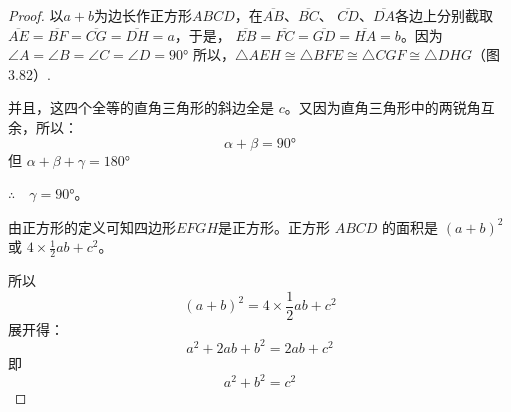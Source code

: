 \begin{proof}
以$a+b$为边长作正方形$ABCD$，在$\overline{AB}$、$\overline{BC}$、
$\overline{CD}$、$\overline{DA}$各边上分别截取$\overline{AE}=\overline{BF}=\overline{CG}=\overline{DH}=a$，于是，
$\overline{EB}=\overline{FC}=\overline{GD}=\overline{HA}=b$。因为$\angle A=\angle B=\angle C=\angle D=\ang{90}$
所以，$\triangle AEH\cong \triangle BFE\cong \triangle CGF\cong \triangle DHG$（图3.82）.

并且，这四个全等的直角三角形的斜边全是 $c$。又因为直角三角形中的两锐角互余，所以：
\[\alpha+\beta=\ang{90}\]
但 $\alpha+\beta+\gamma=\ang{180}$

$\therefore\quad \gamma=\ang{90}$。

由正方形的定义可知四边形$EFGH$是正方形。正方形 $ABCD$ 的面积是 $(a+b)^2$ 或 $4\times\frac{1}{2}ab+c^2$。

所以
\[(a+b)^2=4\times\frac{1}{2}ab+c^2\]
展开得：
\[a^2+2ab+b^2=2ab+c^2\]
即
\[a^2+b^2=c^2\]
\end{proof}

